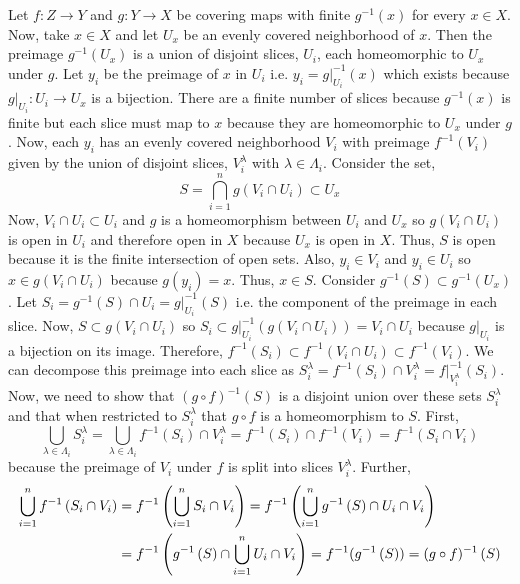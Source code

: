 \documentclass[12pt]{extarticle}
\theoremstyle{remark}
\begin{document}
Let $f : Z \to Y$ and $g : Y \to X$ be covering maps with finite $g^{-1}(x)$ for every $x \in X$. Now, take $x \in X$ and let $U_x$ be an evenly covered neighborhood of $x$. Then the preimage $g^{-1}(U_x)$ is a union of disjoint slices, $U_i$, each homeomorphic to $U_x$ under $g$. Let $y_i$ be the preimage of $x$ in $U_i$ i.e. $y_i = g|_{U_i}^{-1}(x)$ which exists because $g|_{U_i} : U_i \to U_x$ is a bijection. There are a finite number of slices because $g^{-1}(x)$ is finite but each slice must map to $x$ because they are homeomorphic to $U_x$ under $g$. Now, each $y_i$ has an evenly covered neighborhood $V_i$ with preimage $f^{-1}(V_i)$ given by the union of disjoint slices, $V_{i}^\lambda$ with $\lambda \in \Lambda_i$. Consider the set,
\[S = \bigcap_{i = 1}^n g(V_i \cap U_i) \subset U_x\] 
Now, $V_i \cap U_i \subset U_i$ and $g$ is a homeomorphism between $U_i$ and $U_x$ so $g(V_i \cap U_i)$ is open in $U_i$ and therefore open in $X$ because $U_x$ is open in $X$. Thus, $S$ is open because it is the finite intersection of open sets. Also, $y_i \in V_i$ and $y_i \in U_i$ so $x \in g(V_i \cap U_i)$ because $g(y_i) = x$. Thus, $x \in S$. Consider $g^{-1}(S) \subset g^{-1}(U_x)$. Let $S_i = g^{-1}(S) \cap U_i = g|_{U_i}^{-1}(S)$ i.e. the component of the preimage in each slice. Now, $S \subset g(V_i \cap U_i)$ so $S_i \subset g|_{U_i}^{-1}(g(V_i \cap U_i)) = V_i \cap U_i$ because $g|_{U_i}$ is a bijection on its image. Therefore, $f^{-1}(S_i) \subset f^{-1}(V_i \cap U_i) \subset f^{-1}(V_i)$. We can decompose this preimage into each slice as $S_{i}^\lambda = f^{-1}(S_i) \cap V_{i}^\lambda = f|_{V_{i}^\lambda}^{-1}(S_i)$. Now, we need to show that $(g \circ f)^{-1}(S)$ is a disjoint union over these sets $S_i^\lambda$ and that when restricted to $S_i^\lambda$ that $g \circ f$ is a homeomorphism to $S$. First, 
\[\bigcup_{\lambda \in \Lambda_i} S_i^\lambda = \bigcup_{\lambda \in \Lambda_i} f^{-1}(S_i) \cap V_{i}^\lambda = f^{-1}(S_i) \cap f^{-1}(V_i) = f^{-1}(S_i \cap V_i) \]
because the preimage of $V_i$ under $f$ is split into slices $V_i^\lambda$. Further,   
\begin{align*}
\bigcup_{i = 1}^n f^{-1} \left( S_i \cap V_i \right) &= f^{-1} \left( \bigcup_{i = 1}^n S_i \cap V_i \right) = f^{-1} \left(  \bigcup_{i = 1}^n g^{-1} \left( S \right) \cap U_i \cap V_i \right) \\ & = f^{-1} \left( g^{-1} \left( S \right) \cap \bigcup_{i = 1}^n U_i \cap V_i  \right) = f^{-1}(g^{-1} \left( S \right)) = (g \circ f)^{-1} \left( S \right)
\end{align*}
\end{document}
